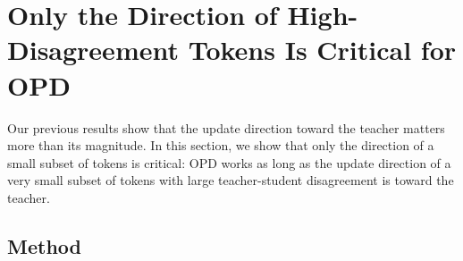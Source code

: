\documentclass{article}
\theoremstyle{remark}
\begin{document}



\section{Only the Direction of High-Disagreement Tokens Is Critical for OPD}
\label{sec:high-disagreement}

Our previous results show that the update direction toward the teacher matters more than its magnitude. In this section, we show that only the direction of a small subset of tokens is critical: OPD works as long as the update direction of a very small subset of tokens with large teacher-student disagreement is toward the teacher.

\subsection{Method}
\label{sec:high-disagreement-method}
\end{document}
